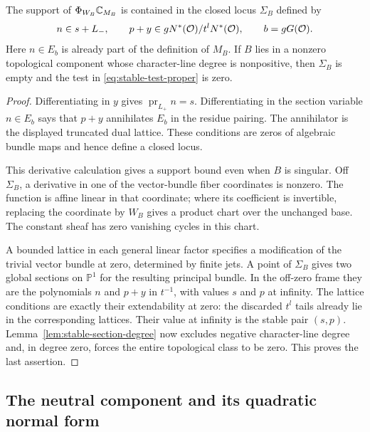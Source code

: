 \begin{lemma}
\label{lem:stable-test-support}
The support of $\Phi_{W_B}\mathbb C_{M_B}$ is contained in the closed locus
$\Sigma_B$ defined by
\begin{equation}
\label{eq:stable-critical-equations}
 n\in s+L_-,
 \qquad
 p+y\in gN^*(\mathcal O)/t^lN^*(\mathcal O),
 \qquad b=gG(\mathcal O).
\end{equation}
Here $n\in E_b$ is already part of the definition of $M_B$.
If $B$ lies in a nonzero topological component whose character-line
degree is nonpositive, then $\Sigma_B$ is empty and the test in
\eqref{eq:stable-test-proper} is zero.
\end{lemma}

\begin{proof}
Differentiating in $y$ gives
$\operatorname{pr}_{L_+}n=s$.  Differentiating in the section variable
$n\in E_b$ says that $p+y$ annihilates $E_b$ in the residue pairing.
The annihilator is the displayed truncated dual lattice.  These
conditions are zeros of algebraic bundle maps and hence define a closed
locus.

This derivative calculation gives a support bound even when $B$ is
singular.  Off $\Sigma_B$, a derivative in one of the vector-bundle fiber
coordinates is nonzero.  The function is affine linear in that
coordinate; where its coefficient is invertible, replacing the
coordinate by $W_B$ gives a product chart over the unchanged base.
The constant sheaf has zero vanishing cycles in this chart.

A bounded lattice in each general linear factor specifies a modification
of the trivial vector bundle at zero, determined by finite jets.
A point of $\Sigma_B$ gives two global sections on $\mathbb P^1$ for the
resulting principal bundle.  In the off-zero frame they are the
polynomials $n$ and $p+y$ in $t^{-1}$, with values $s$ and $p$ at
infinity.  The lattice conditions are exactly their extendability at
zero: the discarded $t^l$ tails already lie in the corresponding
lattices.  Their value at infinity is the stable pair $(s,p)$.
Lemma~\ref{lem:stable-section-degree} now excludes negative
character-line degree and, in degree zero, forces the entire
topological class to be zero.  This proves the last assertion.
\end{proof}

\subsection{The neutral component and its quadratic normal form}

